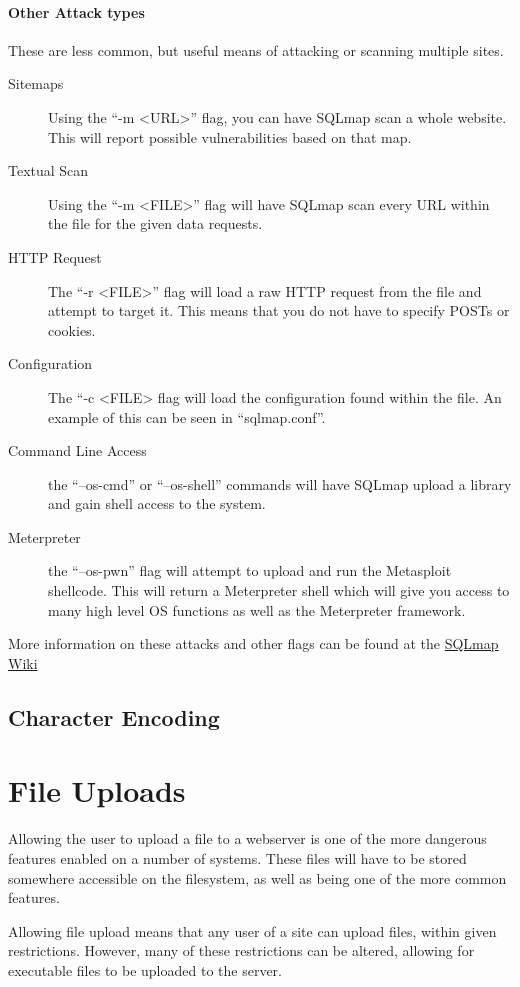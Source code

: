 			\paragraph{Other Attack types}
				These are less common, but useful means of attacking or scanning multiple sites. 
				\begin{description}
					\item[Sitemaps] Using the ``-m <URL>'' flag, you can have SQLmap scan a whole website. 
						This will report possible vulnerabilities based on that map. 
					\item[Textual Scan] Using the ``-m <FILE>'' flag will have SQLmap scan every URL within the file for the given data requests. 
					\item[HTTP Request] The ``-r <FILE>'' flag will load a raw HTTP request from the file and attempt to target it. 
						This means that you do not have to specify POSTs or cookies. 
					\item[Configuration] The ``-c <FILE> flag will load the configuration found within the file. 
						An example of this can be seen in ``sqlmap.conf''. 
					\item[Command Line Access] the ``--os-cmd'' or ``--os-shell'' commands will have SQLmap upload a library and gain shell access to the system. 
					\item[Meterpreter] the ``--os-pwn'' flag will attempt to upload and run the Metasploit shellcode. 
						This will return a Meterpreter shell which will give you access to many high level OS functions as well as the Meterpreter framework. 
				\end{description}
				More information on these attacks and other flags can be found at the \href{https://github.com/sqlmapproject/sqlmap/wiki}{SQLmap Wiki}
		\subsection{Character Encoding}
	\section{File Uploads}
		Allowing the user to upload a file to a webserver is one of the more dangerous features enabled on a number of systems. 
		These files will have to be stored somewhere accessible on the filesystem, as well as being one of the more common features. 

		Allowing file upload means that any user of a site can upload files, within given restrictions. 
		However, many of these restrictions can be altered, allowing for executable files to be uploaded to the server. 

